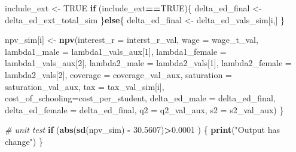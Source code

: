 \documentclass[]{article}
\newenvironment{Shaded}{\begin{snugshade}}{\end{snugshade}}
\newcommand{\CommentTok}[1]{\textcolor[rgb]{0.56,0.35,0.01}{\textit{#1}}}
\newcommand{\ControlFlowTok}[1]{\textcolor[rgb]{0.13,0.29,0.53}{\textbf{#1}}}
\newcommand{\DataTypeTok}[1]{\textcolor[rgb]{0.13,0.29,0.53}{#1}}
\newcommand{\DecValTok}[1]{\textcolor[rgb]{0.00,0.00,0.81}{#1}}
\newcommand{\FloatTok}[1]{\textcolor[rgb]{0.00,0.00,0.81}{#1}}
\newcommand{\KeywordTok}[1]{\textcolor[rgb]{0.13,0.29,0.53}{\textbf{#1}}}
\newcommand{\NormalTok}[1]{#1}
\newcommand{\OperatorTok}[1]{\textcolor[rgb]{0.81,0.36,0.00}{\textbf{#1}}}
\newcommand{\OtherTok}[1]{\textcolor[rgb]{0.56,0.35,0.01}{#1}}
\newcommand{\StringTok}[1]{\textcolor[rgb]{0.31,0.60,0.02}{#1}}
\begin{document}
\begin{Shaded}
\begin{Highlighting}[]
\NormalTok{  include_ext <-}\StringTok{ }\OtherTok{TRUE}
  \ControlFlowTok{if}\NormalTok{ (include_ext}\OperatorTok{==}\OtherTok{TRUE}\NormalTok{)\{}
\NormalTok{    delta_ed_final <-}\StringTok{  }\NormalTok{delta_ed_ext_total_sim}
\NormalTok{  \}}\ControlFlowTok{else}\NormalTok{\{}
\NormalTok{    delta_ed_final <-}\StringTok{ }\NormalTok{delta_ed_vals_sim[i,]}
\NormalTok{  \}}
  
\NormalTok{  npv_sim[i] <-}\StringTok{ }\KeywordTok{npv}\NormalTok{(}\DataTypeTok{interest_r =}\NormalTok{ interst_r_val, }
                     \DataTypeTok{wage =}\NormalTok{ wage_t_val, }
                     \DataTypeTok{lambda1_male =}\NormalTok{ lambda1_vals_aux[}\DecValTok{1}\NormalTok{], }
                     \DataTypeTok{lambda1_female =}\NormalTok{ lambda1_vals_aux[}\DecValTok{2}\NormalTok{], }
                     \DataTypeTok{lambda2_male =}\NormalTok{  lambda2_vals[}\DecValTok{1}\NormalTok{], }
                     \DataTypeTok{lambda2_female =}\NormalTok{  lambda2_vals[}\DecValTok{2}\NormalTok{],}
                     \DataTypeTok{coverage =}\NormalTok{ coverage_val_aux,}
                     \DataTypeTok{saturation =}\NormalTok{ saturation_val_aux,}
                     \DataTypeTok{tax =}\NormalTok{ tax_val_sim[i], }
                     \DataTypeTok{cost_of_schooling=}\NormalTok{cost_per_student, }
                     \DataTypeTok{delta_ed_male =}\NormalTok{ delta_ed_final, }
                     \DataTypeTok{delta_ed_female =}\NormalTok{ delta_ed_final, }
                     \DataTypeTok{q2 =}\NormalTok{ q2_val_aux, }
                     \DataTypeTok{s2 =}\NormalTok{ s2_val_aux)}
\NormalTok{\}}

\CommentTok{# unit test}
\ControlFlowTok{if}\NormalTok{ (}\KeywordTok{abs}\NormalTok{(}\KeywordTok{sd}\NormalTok{(npv_sim) }\OperatorTok{-}\StringTok{ }\FloatTok{30.5607}\NormalTok{)}\OperatorTok{>}\FloatTok{0.0001}\NormalTok{ ) \{}
  \KeywordTok{print}\NormalTok{(}\StringTok{"Output has change"}\NormalTok{)}
\NormalTok{\}}


\end{Highlighting}
\end{Shaded}
\end{document}
